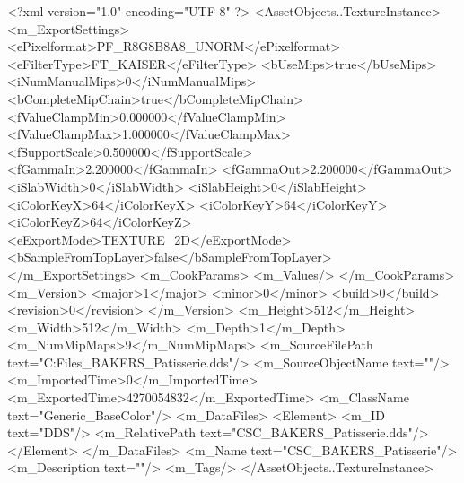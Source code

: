 <?xml version="1.0" encoding="UTF-8" ?>
<AssetObjects..TextureInstance>
	<m_ExportSettings>
		<ePixelformat>PF_R8G8B8A8_UNORM</ePixelformat>
		<eFilterType>FT_KAISER</eFilterType>
		<bUseMips>true</bUseMips>
		<iNumManualMips>0</iNumManualMips>
		<bCompleteMipChain>true</bCompleteMipChain>
		<fValueClampMin>0.000000</fValueClampMin>
		<fValueClampMax>1.000000</fValueClampMax>
		<fSupportScale>0.500000</fSupportScale>
		<fGammaIn>2.200000</fGammaIn>
		<fGammaOut>2.200000</fGammaOut>
		<iSlabWidth>0</iSlabWidth>
		<iSlabHeight>0</iSlabHeight>
		<iColorKeyX>64</iColorKeyX>
		<iColorKeyY>64</iColorKeyY>
		<iColorKeyZ>64</iColorKeyZ>
		<eExportMode>TEXTURE_2D</eExportMode>
		<bSampleFromTopLayer>false</bSampleFromTopLayer>
	</m_ExportSettings>
	<m_CookParams>
		<m_Values/>
	</m_CookParams>
	<m_Version>
		<major>1</major>
		<minor>0</minor>
		<build>0</build>
		<revision>0</revision>
	</m_Version>
	<m_Height>512</m_Height>
	<m_Width>512</m_Width>
	<m_Depth>1</m_Depth>
	<m_NumMipMaps>9</m_NumMipMaps>
	<m_SourceFilePath text="C:\Users\Shadow\Desktop\Working Files\Textures\CSC_BAKERS_Patisserie.dds"/>
	<m_SourceObjectName text=""/>
	<m_ImportedTime>0</m_ImportedTime>
	<m_ExportedTime>4270054832</m_ExportedTime>
	<m_ClassName text="Generic_BaseColor"/>
	<m_DataFiles>
		<Element>
			<m_ID text="DDS"/>
			<m_RelativePath text="CSC_BAKERS_Patisserie.dds"/>
		</Element>
	</m_DataFiles>
	<m_Name text="CSC_BAKERS_Patisserie"/>
	<m_Description text=""/>
	<m_Tags/>
</AssetObjects..TextureInstance>

